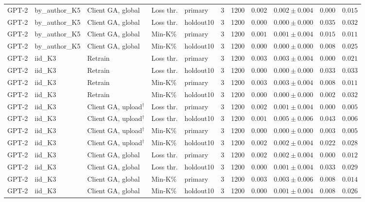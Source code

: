 {\begin{longtable}{@{\extracolsep{\fill}}lllllcccccc@{}}
GPT-2 & by\_author\_K5 & Client GA, global & Loss thr. & primary & 3 & 1200 & $0.002$ & $0.002 \pm 0.004$ & $0.000$ & $0.015$ \\
GPT-2 & by\_author\_K5 & Client GA, global & Loss thr. & holdout10 & 3 & 1200 & $0.000$ & $0.000 \pm 0.000$ & $0.035$ & $0.032$ \\
GPT-2 & by\_author\_K5 & Client GA, global & Min-K\% & primary & 3 & 1200 & $0.001$ & $0.001 \pm 0.004$ & $0.015$ & $0.011$ \\
GPT-2 & by\_author\_K5 & Client GA, global & Min-K\% & holdout10 & 3 & 1200 & $0.000$ & $0.000 \pm 0.000$ & $0.008$ & $0.025$ \\
GPT-2 & iid\_K3 & Retrain & Loss thr. & primary & 3 & 1200 & $0.003$ & $0.003 \pm 0.004$ & $0.000$ & $0.021$ \\
GPT-2 & iid\_K3 & Retrain & Loss thr. & holdout10 & 3 & 1200 & $0.000$ & $0.000 \pm 0.000$ & $0.033$ & $0.033$ \\
GPT-2 & iid\_K3 & Retrain & Min-K\% & primary & 3 & 1200 & $0.003$ & $0.003 \pm 0.004$ & $0.008$ & $0.011$ \\
GPT-2 & iid\_K3 & Retrain & Min-K\% & holdout10 & 3 & 1200 & $0.000$ & $0.000 \pm 0.000$ & $0.002$ & $0.032$ \\
GPT-2 & iid\_K3 & Client GA, upload$^{\dagger}$ & Loss thr. & primary & 3 & 1200 & $0.002$ & $0.001 \pm 0.004$ & $0.000$ & $0.005$ \\
GPT-2 & iid\_K3 & Client GA, upload$^{\dagger}$ & Loss thr. & holdout10 & 3 & 1200 & $0.001$ & $0.005 \pm 0.006$ & $0.043$ & $0.006$ \\
GPT-2 & iid\_K3 & Client GA, upload$^{\dagger}$ & Min-K\% & primary & 3 & 1200 & $0.000$ & $0.000 \pm 0.000$ & $0.003$ & $0.005$ \\
GPT-2 & iid\_K3 & Client GA, upload$^{\dagger}$ & Min-K\% & holdout10 & 3 & 1200 & $0.002$ & $0.002 \pm 0.004$ & $0.022$ & $0.028$ \\
GPT-2 & iid\_K3 & Client GA, global & Loss thr. & primary & 3 & 1200 & $0.002$ & $0.002 \pm 0.004$ & $0.000$ & $0.012$ \\
GPT-2 & iid\_K3 & Client GA, global & Loss thr. & holdout10 & 3 & 1200 & $0.000$ & $0.001 \pm 0.004$ & $0.033$ & $0.029$ \\
GPT-2 & iid\_K3 & Client GA, global & Min-K\% & primary & 3 & 1200 & $0.003$ & $0.003 \pm 0.006$ & $0.008$ & $0.014$ \\
GPT-2 & iid\_K3 & Client GA, global & Min-K\% & holdout10 & 3 & 1200 & $0.000$ & $0.001 \pm 0.004$ & $0.008$ & $0.026$ \\

\end{longtable}}

